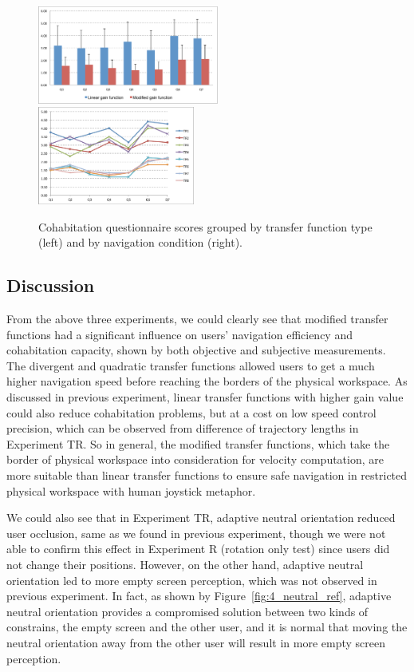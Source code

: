 \begin{figure}[htb]
  \centering
  \includegraphics[width=0.53\textwidth]{figures/ch4/qn_bar}
  \includegraphics[width=0.46\textwidth]{figures/ch4/qn_line}
  \caption{\label{fig:4_questionnaire}Cohabitation questionnaire scores grouped by transfer function type (left) and by navigation condition (right).}
\end{figure}

\subsection{Discussion}
From the above three experiments, we could clearly see that modified transfer functions had a significant influence on users' navigation efficiency and cohabitation capacity, shown by both objective and subjective measurements. The divergent and quadratic transfer functions allowed users to get a much higher navigation speed before reaching the borders of the physical workspace. As discussed in previous experiment, linear transfer functions with higher gain value could also reduce cohabitation problems, but at a cost on low speed control precision, which can be observed from difference of trajectory lengths in Experiment TR. So in general, the modified transfer functions, which take the border of physical workspace into consideration for velocity computation, are more suitable than linear transfer functions to ensure safe navigation in restricted physical workspace with human joystick metaphor.

We could also see that in Experiment TR, adaptive neutral orientation reduced user occlusion, same as we found in previous experiment, though we were not able to confirm this effect in Experiment R (rotation only test) since users did not change their positions. However, on the other hand, adaptive neutral orientation led to more empty screen perception, which was not observed in previous experiment. In fact, as shown by Figure~\ref{fig:4_neutral_ref}, adaptive neutral orientation provides a compromised solution between two kinds of constrains, the empty screen and the other user, and it is normal that moving the neutral orientation away from the other user will result in more empty screen perception.

